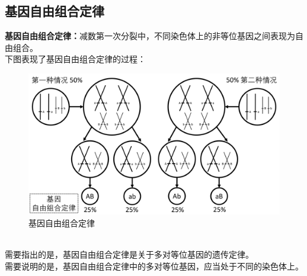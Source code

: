 \documentclass[UTF8]{ctexart}
\begin{document}
\subsection{基因自由组合定律}
    \textbf{基因自由组合定律：}减数第一次分裂中，不同染色体上的非等位基因之间表现为自由组合。\\[3mm]
    下图表现了基因自由组合定律的过程：\vspace{10pt}
    \begin{figure}[h]
        \begin{center}
            \includegraphics[width=14cm]{BiologyImage/58.jpg}
        \end{center}
        \caption{基因自由组合定律}
    \end{figure}\\[1mm]
    需要指出的是，基因自由组合定律是关于多对等位基因的遗传定律。\\[3mm]
    需要说明的是，基因自由组合定律中的多对等位基因，应当处于不同的染色体上。

\newpage
\end{document}
